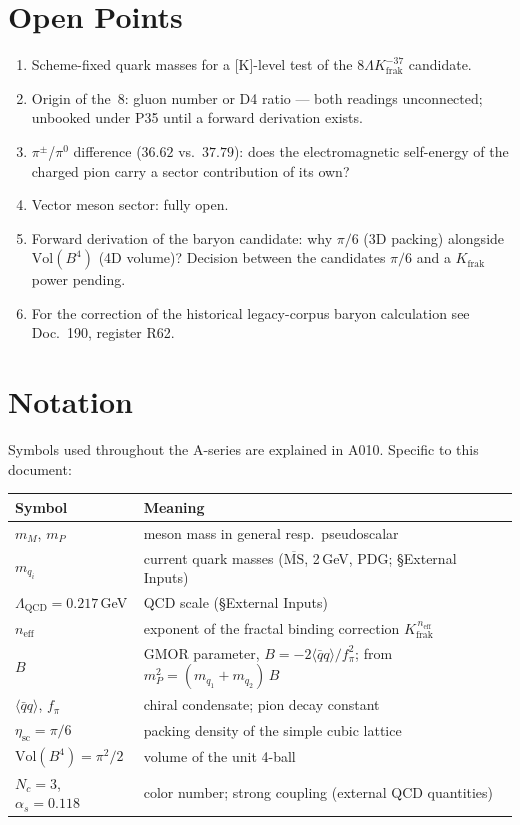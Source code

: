 \section{Open Points}

\begin{enumerate}
\item Scheme-fixed quark masses for a [K]-level test of the
  $8\Lambda K_\text{frak}^{-37}$ candidate.
\item Origin of the~8: gluon number or D4 ratio --- both readings
  unconnected; unbooked under P35 until a forward derivation exists.
\item $\pi^\pm$/$\pi^0$ difference ($36{.}62$ vs.\ $37{.}79$): does the
  electromagnetic self-energy of the charged pion carry a sector
  contribution of its own?
\item Vector meson sector: fully open.
\item Forward derivation of the baryon candidate: why $\pi/6$ (3D
  packing) alongside $\text{Vol}(B^4)$ (4D volume)? Decision between
  the candidates $\pi/6$ and a $K_\text{frak}$ power pending.
\item For the correction of the historical legacy-corpus baryon
  calculation see Doc.~190, register R62.
\end{enumerate}

\section{Notation}

Symbols used throughout the A-series are explained in A010.
Specific to this document:

\begin{center}
\renewcommand{\arraystretch}{1.3}
{\small\begin{tabular}{lp{9cm}}
\toprule
Symbol & Meaning \\
\midrule
$m_M$, $m_P$ & meson mass in general resp.\ pseudoscalar \\
$m_{q_i}$ & current quark masses ($\overline{\text{MS}}$, 2\,GeV, PDG; \S{}External Inputs) \\
$\Lambda_\text{QCD}=0{.}217$\,GeV & QCD scale (\S{}External Inputs) \\
$n_\text{eff}$ & exponent of the fractal binding correction $K_\text{frak}^{\,n_\text{eff}}$ \\
$B$ & GMOR parameter, $B=-2\langle\bar qq\rangle/f_\pi^2$; from $m_P^2=(m_{q_1}+m_{q_2})\,B$ \\
$\langle\bar qq\rangle$, $f_\pi$ & chiral condensate; pion decay constant \\
$\eta_\text{sc}=\pi/6$ & packing density of the simple cubic lattice \\
$\text{Vol}(B^4)=\pi^2/2$ & volume of the unit 4-ball \\
$N_c=3$, $\alpha_s=0{.}118$ & color number; strong coupling (external QCD quantities) \\
\bottomrule
\end{tabular}}
\renewcommand{\arraystretch}{1.0}
\end{center}

